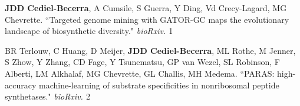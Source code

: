 \begin{cvpubs}


\cvpub
{\textbf{JDD Cediel-Becerra}, A Cumsile, S Guerra, Y Ding, Vd Crecy-Lagard, MG Chevrette. ``Targeted genome mining with GATOR-GC maps the evolutionary landscape of biosynthetic diversity." \textit{bioRxiv. \textbf{}}}
{1}

\cvpub
{BR Terlouw, C Huang, D Meijer, \textbf{JDD Cediel-Becerra}, ML Rothe, M Jenner, S Zhow, Y Zhang, CD Fage, Y Tsunematsu, GP van Wezel, SL Robinson, F Alberti, LM Alkhalaf, MG Chevrette, GL Challis, MH Medema. ``PARAS: high-accuracy machine-learning of substrate specificities in nonribosomal peptide synthetases." \textit{bioRxiv. \textbf{}}}
{2}


\end{cvpubs}
